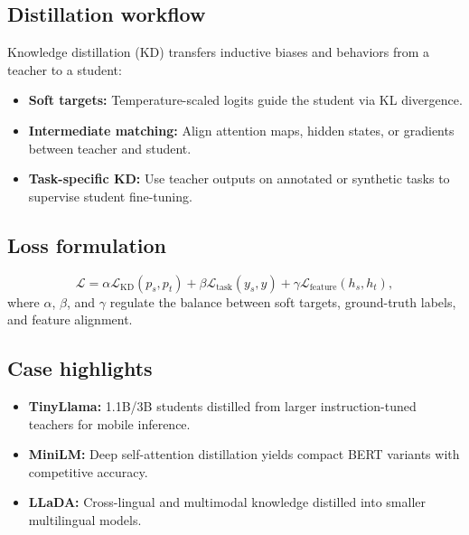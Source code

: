 \documentclass{article}
\begin{document}
\subsection{Distillation workflow}
Knowledge distillation (KD) transfers inductive biases and behaviors from a teacher to a student:
\begin{itemize}
  \item \textbf{Soft targets:} Temperature-scaled logits guide the student via KL divergence.
  \item \textbf{Intermediate matching:} Align attention maps, hidden states, or gradients between teacher and student.
  \item \textbf{Task-specific KD:} Use teacher outputs on annotated or synthetic tasks to supervise student fine-tuning.
\end{itemize}

\subsection{Loss formulation}
\begin{equation}
\mathcal{L} = \alpha \mathcal{L}_{\text{KD}}(p_s, p_t) + \beta \mathcal{L}_{\text{task}}(y_s, y) + \gamma \mathcal{L}_{\text{feature}}(h_s, h_t),
\end{equation}
where $\alpha$, $\beta$, and $\gamma$ regulate the balance between soft targets, ground-truth labels, and feature alignment.

\subsection{Case highlights}
\begin{itemize}
  \item \textbf{TinyLlama:} 1.1B/3B students distilled from larger instruction-tuned teachers for mobile inference.
  \item \textbf{MiniLM:} Deep self-attention distillation yields compact BERT variants with competitive accuracy.
  \item \textbf{LLaDA:} Cross-lingual and multimodal knowledge distilled into smaller multilingual models.
\end{itemize}
\end{document}
